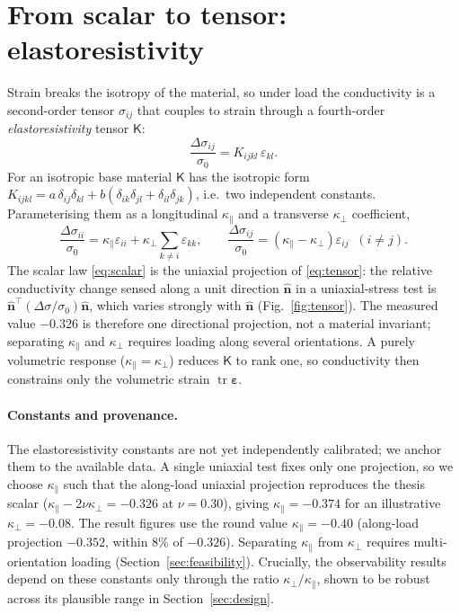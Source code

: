 \documentclass[11pt]{article}
\newcommand{\dsig}{\Delta\sigma}
\newcommand{\eps}{\bm{\varepsilon}}
\newcommand{\Kt}{\mathsf{K}}
\begin{document}
\section{From scalar to tensor: elastoresistivity}
\label{sec:tensor}
Strain breaks the isotropy of the material, so under load the conductivity is a
second-order tensor $\sigma_{ij}$ that couples to strain through a fourth-order
\emph{elastoresistivity} tensor $\Kt$:
\begin{equation}
  \frac{\dsig_{ij}}{\sigma_0} = K_{ijkl}\,\varepsilon_{kl}.
  \label{eq:tensor}
\end{equation}
For an isotropic base material $\Kt$ has the isotropic form
$K_{ijkl}=a\,\delta_{ij}\delta_{kl}+b(\delta_{ik}\delta_{jl}+\delta_{il}\delta_{jk})$,
i.e.\ two independent constants. Parameterising them as a longitudinal
$\kappa_\parallel$ and a transverse $\kappa_\perp$ coefficient,
\begin{equation}
  \frac{\dsig_{ii}}{\sigma_0}=\kappa_\parallel\varepsilon_{ii}
  + \kappa_\perp\!\!\sum_{k\neq i}\varepsilon_{kk}, \qquad
  \frac{\dsig_{ij}}{\sigma_0}=(\kappa_\parallel-\kappa_\perp)\varepsilon_{ij}
  \;\; (i\neq j).
\end{equation}
The scalar law \eqref{eq:scalar} is the uniaxial projection of \eqref{eq:tensor}:
the relative conductivity change sensed along a unit direction $\hat{\bm n}$ in a
uniaxial-stress test is $\hat{\bm n}^{\!\top}(\dsig/\sigma_0)\hat{\bm n}$, which
varies strongly with $\hat{\bm n}$ (Fig.~\ref{fig:tensor}). The measured value
$-0.326$ is therefore one directional projection, not a material invariant;
separating $\kappa_\parallel$ and $\kappa_\perp$ requires loading along several
orientations. A purely volumetric response ($\kappa_\parallel=\kappa_\perp$)
reduces $\Kt$ to rank one, so conductivity then constrains only the volumetric
strain $\operatorname{tr}\eps$.

\paragraph{Constants and provenance.} The elastoresistivity constants are not yet
independently calibrated; we anchor them to the available data. A single uniaxial
test fixes only one projection, so we choose $\kappa_\parallel$ such that the
along-load uniaxial projection reproduces the thesis scalar
($\kappa_\parallel-2\nu\kappa_\perp=-0.326$ at $\nu=0.30$), giving
$\kappa_\parallel=-0.374$ for an illustrative $\kappa_\perp=-0.08$. The result
figures use the round value $\kappa_\parallel=-0.40$ (along-load projection
$-0.352$, within $8\%$ of $-0.326$). Separating $\kappa_\parallel$ from
$\kappa_\perp$ requires multi-orientation loading (Section~\ref{sec:feasibility}).
Crucially, the observability results depend on these constants only through the
ratio $\kappa_\perp/\kappa_\parallel$, shown to be robust across its plausible
range in Section~\ref{sec:design}.
\end{document}
